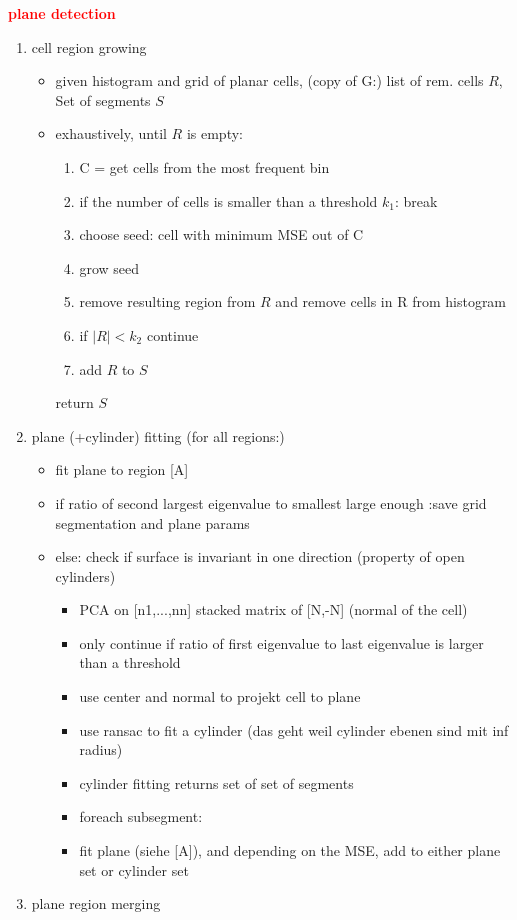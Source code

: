 \documentclass[main.tex]{subfiles}
\begin{document}
\textbf{\textcolor{red}{plane detection}}
\begin{enumerate}
    \item cell region growing
          \begin{itemize}
              \item given histogram and grid of planar cells, (copy of G:) list of rem. cells $R$, Set of segments $S$
              \item exhaustively, until $R$ is empty:
                    \begin{enumerate}
                        \item C = get cells from the most frequent bin
                        \item if the number of cells is smaller than a threshold $k_1$: break
                        \item choose seed: cell with minimum MSE out of C
                        \item grow seed
                        \item remove resulting region from $R$ and remove cells in R from histogram
                        \item if $|R|< k_2$ continue
                        \item add $R$ to $S$
                    \end{enumerate}
                    return $S$
          \end{itemize}
    \item plane (+cylinder) fitting (for all regions:)
          \begin{itemize}
              \item fit plane to region  [A]
              \item if ratio of second largest eigenvalue to smallest large enough :save grid segmentation and plane params
              \item else: check if surface is invariant in one direction (property of open cylinders)
                    \begin{itemize}
                        \item PCA on [n1,...,nn] stacked matrix of [N,-N] (normal of the cell)
                        \item only continue if ratio of first eigenvalue to last eigenvalue is larger than a threshold
                        \item use center and normal to projekt cell to plane
                        \item use ransac to fit a cylinder (das geht weil cylinder ebenen sind mit inf radius)
                        \item cylinder fitting returns set of set of segments
                        \item foreach subsegment:
                        \item fit plane (siehe [A]), and depending on the MSE, add to either plane set or cylinder set
                    \end{itemize}
          \end{itemize}
    \item plane region merging
\end{enumerate}
\end{document}
